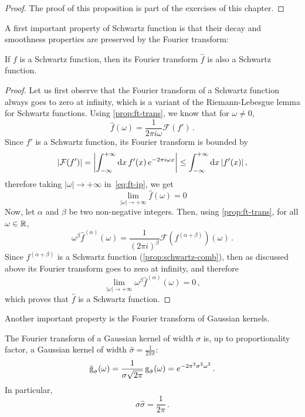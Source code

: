 \begin{proof}
  The proof of this proposition is part of the exercises of this chapter.
\end{proof}
A first important property of Schwartz function is that their decay and smoothness
properties are preserved by the Fourier transform:
\begin{theorem}
  If $f$ is a Schwartz function, then its Fourier transform $\hat{f}$ is also a Schwartz
  function.
\end{theorem}
\begin{proof}
  Let us first observe that the Fourier transform of a Schwartz function always goes to
  zero at infinity, which is a variant of the Riemann-Lebesgue lemma for Schwartz
  functions. Using \cref{prop:ft-trans}, we know that for $\omega\neq 0$,
  \begin{equation}
    \hat{f}(\omega)=\frac{1}{2\pi i\omega}\mathcal{F}(f')\,.\label{eq:ft-ip}
  \end{equation}
  Since $f'$ is a Schwartz function, its Fourier transform is bounded by
  \begin{equation}
    |\mathcal{F}(f')|=\left|\int_{-\infty}^{+\infty}\mathrm{d}{x}\,f'(x)\,e^{-2\pi i \omega x}\right|\leq
    \int_{-\infty}^{+\infty}\mathrm{d}{x}\,|f'(x)|\,,
  \end{equation}
  therefore taking $|\omega|\to+\infty$ in~\cref{eq:ft-ip}, we get
  \begin{equation}
    \lim_{|\omega|\to+\infty}\hat{f}(\omega)=0
  \end{equation}
  Now, let $\alpha$ and $\beta$ be two non-negative integers. Then, using
  \cref{prop:ft-trans}, for all $\omega\in\mathbb{R}$,
  \begin{equation}
    \omega^\beta\hat{f}^{(\alpha)}(\omega)=\frac{1}{(2\pi i)^{\beta}}\mathcal{F}(f^{(\alpha+\beta)})(\omega)\,.
  \end{equation}
  Since $f^{(\alpha+\beta)}$ is a Schwartz function (\cref{prop:schwartz-comb}), then as
  discussed above its Fourier transform goes to zero at infinity, and therefore
  \begin{equation}
    \lim_{|\omega|\to+\infty}\omega^\beta\hat{f}^{(\alpha)}(\omega)=0\,,
  \end{equation}
  which proves that $\hat{f}$ is a Schwartz function.
\end{proof}
Another important property is the Fourier transform of Gaussian kernels.
\begin{theorem}
  \label{thm:gauss-uncertainty}
  The Fourier transform of a Gaussian kernel of width $\sigma$ is, up to proportionality
  factor, a Gaussian kernel of width $\hat{\sigma}=\frac{1}{2\pi\sigma}$:
  \begin{equation}
    \hat{\operatorname{g}}_{\sigma}(\omega)=
    \frac{1}{\sigma\sqrt{2\pi}}\operatorname{g}_{\hat{\sigma}}(\omega)
    =e^{-2\pi^2\sigma^2\omega^2}\,.
  \end{equation}
  In particular,
  \begin{equation}
    \sigma\hat{\sigma}=\frac{1}{2\pi}\,.\label{eq:gauss-uncertainty}
  \end{equation}
\end{theorem}
